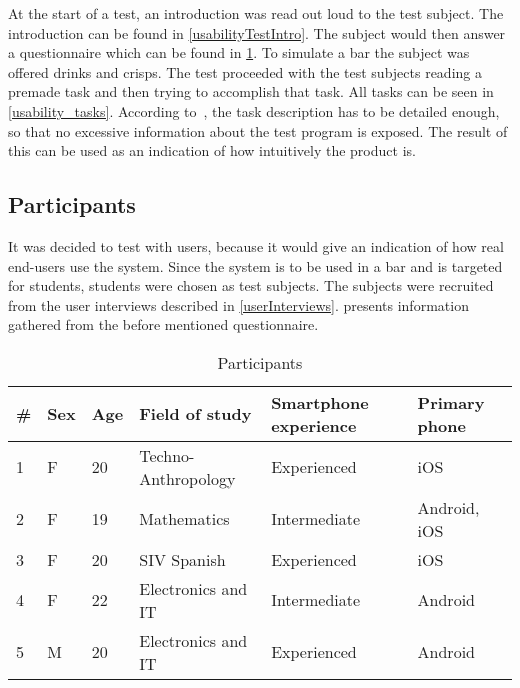 At the start of a test, an introduction was read out loud to the test
subject. The introduction can be found in
\cref{usabilityTestIntro}. The subject would then answer a
questionnaire which can be found in \cref{tab:participants}. To
simulate a bar the subject was offered drinks and crisps. The test
proceeded with the test subjects reading a premade task and then
trying to accomplish that task. All tasks can be seen in \cref{usability_tasks}. According to~\cite{RubinChisnellSpool08}, the task description has to be detailed enough, so that no excessive information about the test program is exposed. The result of this can be used as an indication of how intuitively the product is.

\subsection{Participants}
It was decided to test with users, because it would give an indication
of how real end-users use the system. Since the system is to be used
in a bar and is targeted for students, students were chosen as test
subjects. The subjects were recruited from the user interviews
described in \cref{userInterviews}.  presents
information gathered from the before mentioned questionnaire.

\begin{table}[h]
\begin{tabular}{|l|l|l|l|l|l|}
\hline
\textbf{\#} & \textbf{Sex} & \textbf{Age} & \textbf{Field of study} & \textbf{Smartphone experience} & \textbf{Primary phone} \\ \hline
1                   & F               & 20           & Techno-Anthropology       & Experienced                    & iOS                    \\ \hline
2                   & F               & 19           & Mathematics             & Intermediate                   & Android, iOS           \\ \hline
3                   & F               & 20           & SIV Spanish             & Experienced                    & iOS                    \\ \hline
4                   & F               & 22           & Electronics and IT      & Intermediate                   & Android                \\ \hline
5                   & M               & 20           & Electronics and IT      & Experienced                    & Android                \\ \hline
\end{tabular}
\caption{Participants}\label{tab:participants}
\end{table}

